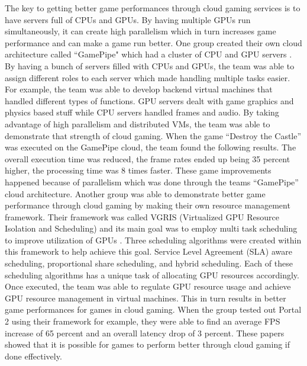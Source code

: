 \documentclass{article}
\begin{document}
The key to getting better game performances through cloud gaming services is to have servers full of CPUs and GPUs. By having multiple GPUs run simultaneously, it can create high parallelism which in turn increases game performance and can make a game run better. One group created their own cloud architecture called “GamePipe"  which had a cluster of CPU and GPU servers \cite{10.1145/2287036.2287042}. By having a bunch of servers filled with CPUs and GPUs, the team was able to assign different roles to each server which made handling multiple tasks easier. For example, the team was able to develop backend virtual machines that handled different types of functions. GPU servers dealt with game graphics and physics based stuff while CPU servers handled frames and audio. By taking advantage of high parallelism and distributed VMs, the team was able to demonstrate that strength of cloud gaming. When the game  “Destroy the Castle'' was executed on the GamePipe cloud, the team found the following results. The overall execution time was reduced, the frame rates ended up being 35 percent higher, the processing time was 8 times faster. These game improvements happened because of parallelism which was done through the teams “GamePipe” cloud architecture. Another group was able to demonstrate better game performance through cloud gaming by making their own resource management framework. Their framework was called VGRIS (Virtualized GPU Resource Isolation and Scheduling) and its main goal was to employ multi task scheduling to improve utilization of GPUs \cite{10.1145/2493123.2462914}. Three scheduling algorithms were created within this framework to help achieve this goal. Service Level Agreement (SLA) aware scheduling, proportional share scheduling, and hybrid scheduling. Each of these scheduling algorithms has a unique task of allocating GPU resources accordingly. Once executed, the team was able to regulate GPU resource usage and achieve GPU resource management in virtual machines. This in turn results in better game performances for games in cloud gaming. When the group tested out Portal 2 using their framework for example, they were able to find an average FPS increase of 65 percent and an overall latency drop of 3 percent. These papers showed that it is possible for games to perform better through cloud gaming if done effectively. 
\end{document}
